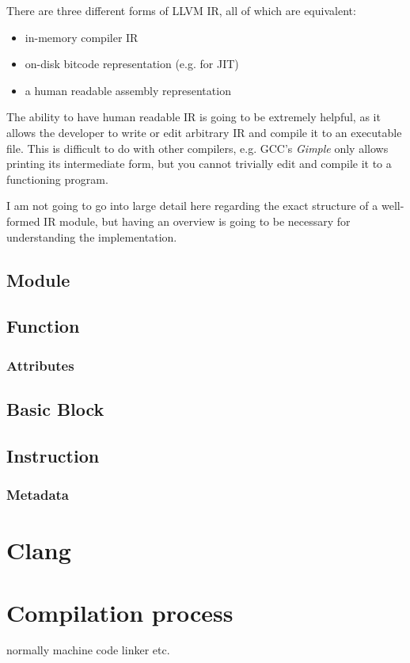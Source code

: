 There are three different forms of LLVM IR, all of which are equivalent:
\begin{itemize}
	\item in-memory compiler IR
	\item on-disk bitcode representation (e.g. for JIT)
	\item a human readable assembly representation
\end{itemize}

The ability to have human readable IR is going to be extremely helpful, as it allows the developer to write or edit arbitrary IR and compile it to an executable file. This is difficult to do with other compilers, e.g. GCC's \emph{Gimple} only allows printing its intermediate form, but you cannot trivially edit and compile it to a functioning program.

I am not going to go into large detail here regarding the exact structure of a well-formed IR module, but having an overview is going to be necessary for understanding the implementation.

\subsection{Module}
\subsection{Function}
\subsubsection{Attributes}
\subsection{Basic Block}
\subsection{Instruction}
\subsubsection{Metadata}

\section{Clang}

\section{Compilation process}
normally machine code linker etc.
